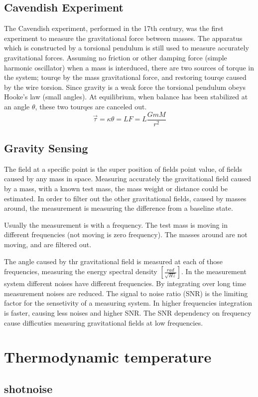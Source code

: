 \documentclass[\main/master.tex]{subfiles}
\begin{document}
\subsection{Cavendish Experiment}
The Cavendish experiment, performed in the 17th century, was the first experiment to measure the gravitational force between masses. The apparatus which is constructed by a torsional pendulum is still used to measure accurately gravitational forces. Assuming no friction or other damping force (simple harmonic oscillator) when a mass is interduced, there are two sources of torque in the system; tourqe by the mass gravitational force, and restoring tourqe caused by the wire torsion. Since gravity is a weak force the torsional pendulum obeys Hooke’s law (small angles). At equilibrium, when balance has been stabilized at an angle $\theta$, these two tourqes are canceled out.
\begin{equation}
\overrightarrow{\tau} = \kappa\theta = LF = L\frac{GmM}{r^2}    \label{eqn:gravitation_tourqe}
\end{equation}


\subsection{Gravity Sensing}
The field at a specific point is the super position of fields point value, of fields caused by any mass in space. Measuring accurately the gravitational field caused by a mass, with a known test mass, the mass weight or distance could be estimated. In order to filter out the other gravitational fields, caused by masses around, the measurement is measuring the difference from a baseline state.
\par
Usually the measurement is with a frequency. The test mass is moving in different frequencies (not moving is zero frequency). The masses around are not moving, and are filtered out.
\par
The angle caused by thr gravitational field is measured at each of those frequencies, measuring the energy spectral density $[\frac{rad}{\sqrt{Hz}}]$.
In the measurement system different noises have different frequencies. By integrating over long time measurement noises are reduced. The signal to noise ratio (SNR) is the limiting factor for the sensetivity of a measuring system. In higher frequencies integration is faster, causing less noises and higher SNR.
The SNR dependency on frequency cause difficuties measuring gravitational fields at low frequencies.




\section{Thermodynamic temperature}

\subsection{shotnoise}
\end{document}
